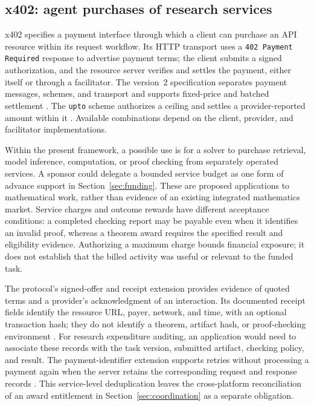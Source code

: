 \documentclass[11pt,a4paper]{article}
\begin{document}
\subsection{x402: agent purchases of research services}
\label{sec:x402}
x402 specifies a payment interface through which a client can purchase an API resource within its request workflow. Its HTTP transport uses a \texttt{402 Payment Required} response to advertise payment terms; the client submits a signed authorization, and the resource server verifies and settles the payment, either itself or through a facilitator. The version~2 specification separates payment messages, schemes, and transport and supports fixed-price and batched settlement \citep{x402}. The \texttt{upto} scheme authorizes a ceiling and settles a provider-reported amount within it \citep{x402usage}. Available combinations depend on the client, provider, and facilitator implementations.

Within the present framework, a possible use is for a solver to purchase retrieval, model inference, computation, or proof checking from separately operated services. A sponsor could delegate a bounded service budget as one form of advance support in Section~\ref{sec:funding}. These are proposed applications to mathematical work, rather than evidence of an existing integrated mathematics market. Service charges and outcome rewards have different acceptance conditions: a completed checking report may be payable even when it identifies an invalid proof, whereas a theorem award requires the specified result and eligibility evidence. Authorizing a maximum charge bounds financial exposure; it does not establish that the billed activity was useful or relevant to the funded task.

The protocol's signed-offer and receipt extension provides evidence of quoted terms and a provider's acknowledgment of an interaction. Its documented receipt fields identify the resource URL, payer, network, and time, with an optional transaction hash; they do not identify a theorem, artifact hash, or proof-checking environment \citep{x402receipts}. For research expenditure auditing, an application would need to associate these records with the task version, submitted artifact, checking policy, and result. The payment-identifier extension supports retries without processing a payment again when the server retains the corresponding request and response records \citep{x402idempotency}. This service-level deduplication leaves the cross-platform reconciliation of an award entitlement in Section~\ref{sec:coordination} as a separate obligation.
\end{document}
